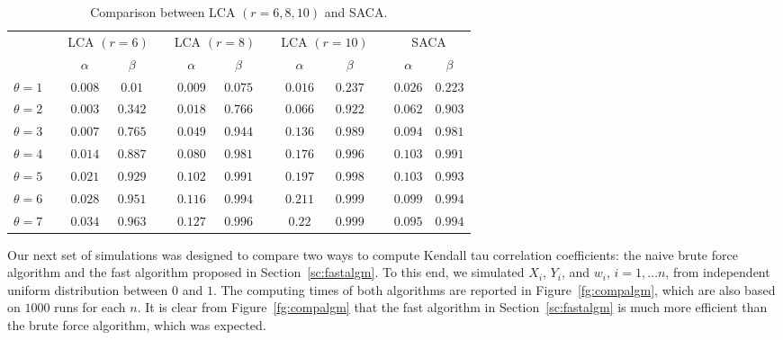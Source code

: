 \documentclass[10pt,twocolumn,twoside]{IEEEtran}
\begin{document}
\begingroup
\renewcommand{\arraystretch}{1.6}
\begin{table*}[h!]
\begin{center}
\begin{tabular}{c c c c c c c c c c c c c}
\hline
\hline
 & & \multicolumn{2}{c}{LCA $(r=6)$} & &  \multicolumn{2}{c}{LCA $(r=8)$}& &\multicolumn{2}{c}{LCA $(r=10)$}& &\multicolumn{2}{c}{SACA} \\
 \cline{3-4}  \cline{6-7}  \cline{9-10} \cline{12-13}
 & & $\alpha$ & $\beta$ & & $\alpha$ & $\beta$ & & $\alpha$ & $\beta$ & & $\alpha$ & $\beta$ \\
\hline
$\theta=1$ & &  $ 0.008 $ & $ 0.01 $ & &  $ 0.009 $ & $ 0.075 $ & &  $ 0.016 $ & $ 0.237 $ & &  $ 0.026 $ & $ 0.223 $ \\ 
$\theta=2$ & &  $ 0.003 $ & $ 0.342 $ & &  $ 0.018 $ & $ 0.766 $ & &  $ 0.066 $ & $ 0.922 $ & &  $ 0.062 $ & $ 0.903 $ \\ 
$\theta=3$ & &  $ 0.007 $ & $ 0.765 $ & &  $ 0.049 $ & $ 0.944 $ & &  $ 0.136 $ & $ 0.989 $ & &  $ 0.094 $ & $ 0.981 $ \\ 
$\theta=4$ & &  $ 0.014 $ & $ 0.887 $ & &  $ 0.080 $ & $ 0.981 $ & &  $ 0.176 $ & $ 0.996 $ & &  $ 0.103 $ & $ 0.991 $ \\ 
$\theta=5$ & &  $ 0.021 $ & $ 0.929 $ & &  $ 0.102 $ & $ 0.991 $ & &  $ 0.197 $ & $ 0.998 $ & &  $ 0.103 $ & $ 0.993 $ \\ 
$\theta=6$ & &  $ 0.028 $ & $ 0.951 $ & &  $ 0.116 $ & $ 0.994 $ & &  $ 0.211 $ & $ 0.999 $ & &  $ 0.099 $ & $ 0.994 $ \\ 
$\theta=7$ & &  $ 0.034 $ & $ 0.963 $ & &  $ 0.127 $ & $ 0.996 $ & &  $ 0.22 $ & $ 0.999 $ & &  $ 0.095 $ & $ 0.994 $ \\
\hline
\hline
\end{tabular}
\end{center}
\caption{Comparison between LCA $(r=6,8,10)$ and SACA.}
\label{tb:smootheffect}
\end{table*}%
\endgroup


Our next set of simulations was designed to compare two ways to compute Kendall tau correlation coefficients: the naive brute force algorithm and the fast algorithm proposed in Section~\ref{sc:fastalgm}. To this end, we simulated $X_i$, $Y_i$, and $w_i$, $i=1,\ldots n$, from independent uniform distribution between $0$ and $1$.  The computing times of both algorithms are reported in Figure~\ref{fg:compalgm}, which are also based on $1000$ runs for each $n$. It is clear from Figure~\ref{fg:compalgm} that the fast algorithm in Section~\ref{sc:fastalgm} is much more efficient than the brute force algorithm, which was expected.
\end{document}

